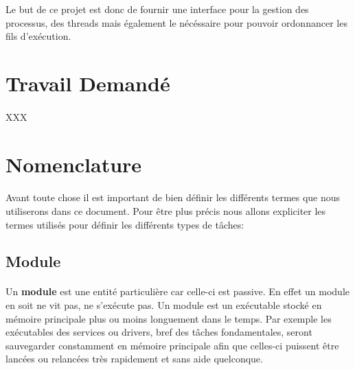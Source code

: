 \documentclass[10pt,a4wide]{article}
\begin{document}
Le but de ce projet est donc de fournir une interface pour la gestion
des processus, des threads mais \'egalement le n\'ec\'essaire pour pouvoir
ordonnancer les fils d'ex\'ecution.

\section{Travail Demand\'e}

\paragraph{}

XXX

\section{Nomenclature}

\paragraph{}

Avant toute chose il est important de bien d\'efinir les diff\'erents
termes que nous utiliserons dans ce document. Pour \^etre plus pr\'ecis
nous allons expliciter les termes utilis\'es pour d\'efinir les
diff\'erents types de t\^aches:

\paragraph{}

\subsection{Module}

\paragraph{}

Un \textbf{module} est une entit\'e particuli\`ere car celle-ci est passive.
En effet un module en soit ne vit pas, ne s'ex\'ecute pas. Un module
est un ex\'ecutable stock\'e en m\'emoire principale plus ou moins longuement
dans le temps. Par exemple les ex\'ecutables des services ou drivers, bref
des t\^aches fondamentales, seront sauvegarder constamment en m\'emoire
principale afin que celles-ci puissent \^etre lanc\'ees ou relanc\'ees
tr\`es rapidement et sans aide quelconque.
\end{document}
